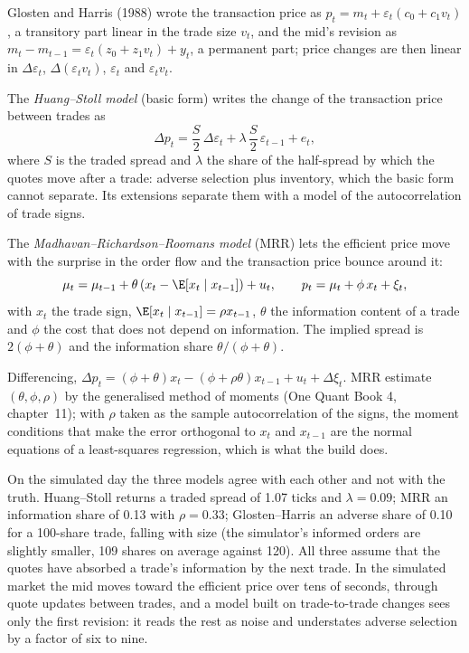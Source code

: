 Glosten and Harris (1988) wrote the transaction price as $p_t=m_t+\varepsilon_t(c_0+c_1v_t)$, a transitory part linear in the trade size $v_t$, and
the mid's revision as $m_t-m_{t-1}=\varepsilon_t(z_0+z_1v_t)+y_t$, a permanent part; price changes are then linear in $\Delta\varepsilon_t$,
$\Delta(\varepsilon_tv_t)$, $\varepsilon_t$ and $\varepsilon_tv_t$.

\begin{definition}\label{def:mx:decomposing-the-spread:hs}
The \emph{Huang--Stoll model} (basic form) writes the change of the transaction price between trades as
\[
\Delta p_t=\frac S2\,\Delta\varepsilon_t+\lambda\,\frac S2\,\varepsilon_{t-1}+e_t,
\]
where $S$ is the traded spread and $\lambda$ the share of the half-spread by which the quotes move after a trade: adverse selection plus inventory, which
the basic form cannot separate. Its extensions separate them with a model of the autocorrelation of trade signs.
\end{definition}

\begin{definition}\label{def:mx:decomposing-the-spread:mrr}
The \emph{Madhavan--Richardson--Roomans model} (MRR) lets the efficient price move with the surprise in
the order flow and the transaction price bounce around it:
\[
\mu_t=\mu_{t-1}+\theta\left(x_t-\E[x_t\mid x_{t-1}]\right)+u_t,\qquad p_t=\mu_t+\phi\,x_t+\xi_t,
\]
with $x_t$ the trade sign, $\E[x_t\mid x_{t-1}]=\rho x_{t-1}$, $\theta$ the information content of a trade and $\phi$ the cost that does not depend on
information. The implied spread is $2(\phi+\theta)$ and the information share $\theta/(\phi+\theta)$.
\end{definition}

Differencing, $\Delta p_t=(\phi+\theta)x_t-(\phi+\rho\theta)x_{t-1}+u_t+\Delta\xi_t$. MRR estimate $(\theta,\phi,\rho)$ by the generalised method of
moments (One Quant Book 4, chapter~11); with $\rho$ taken as the sample autocorrelation of the signs, the moment conditions that make the error orthogonal
to $x_t$ and $x_{t-1}$ are the normal equations of a least-squares regression, which is what the build does.

\label{lst:mx:decomposing-the-spread:mrr}

On the simulated day the three models agree with each other and not with the truth. Huang--Stoll returns a traded spread of 1.07 ticks and
$\lambda=0.09$; MRR an information share of 0.13 with $\rho=0.33$; Glosten--Harris an adverse share of 0.10 for a 100-share trade, falling with size
(the simulator's informed orders are slightly smaller, 109 shares on average against 120). All three assume that the quotes have absorbed a trade's
information by the next trade. In the simulated market the mid moves toward the efficient price over tens of seconds, through quote updates between
trades, and a model built on trade-to-trade changes sees only the first revision: it reads the rest as noise and understates adverse selection by a
factor of six to nine.

